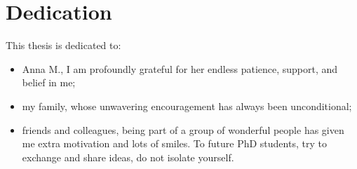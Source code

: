 \newpage
\section*{Dedication}
\label{sec:dedication}

This thesis is dedicated to:

\begin{itemize}
    \item Anna M., I am profoundly grateful for her endless patience, support, and belief in me;
    \item my family, whose unwavering encouragement has always been unconditional;
    \item friends and colleagues, being part of a group of wonderful people has given me extra motivation and lots of smiles. To future PhD students, try to exchange and share ideas, do not isolate yourself.
\end{itemize}
